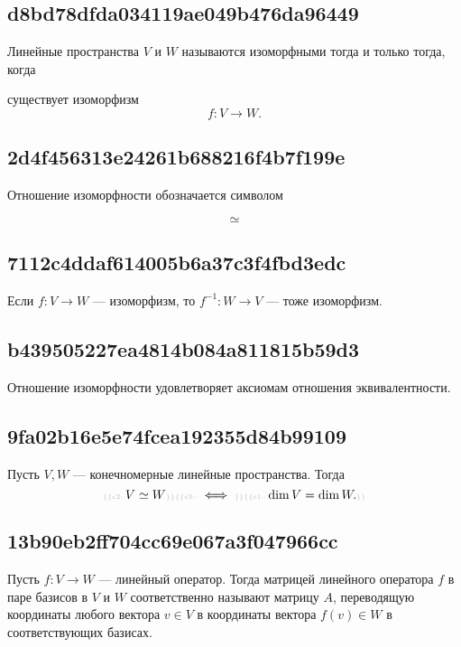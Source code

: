 \documentclass[11pt, a5paper]{article}
\newenvironment{note}[1]{\goodbreak\par\subsection{\hfill \color{lightgray}\tiny #1}}{}
\newenvironment{icloze}[2][\ldots]{%
  \ignorespaces\text{\tiny \color{lightgray} \{\{c#2::}\hspace{0pt}%
}{%
  \hspace{0pt}\text{\tiny \color{lightgray}\}\}}\unskip%
}
\begin{document}
\begin{note}{d8bd78dfda034119ae049b476da96449}
    Линейные пространства \( V \) и \( W \) называются \begin{icloze}{1}и\-зо\-мор\-фны\-ми\end{icloze} тогда и только тогда, когда \begin{icloze}{2}
        существует изоморфизм
        \[
            f : V \to W.
        \]
    \end{icloze}
\end{note}

\begin{note}{2d4f456313e24261b688216f4b7f199e}
    Отношение \begin{icloze}{2}изоморфности\end{icloze} обозначается символом \begin{icloze}{1}
        \[
            \simeq
        \]
    \end{icloze}
\end{note}

\begin{note}{7112c4ddaf614005b6a37c3f4fbd3edc}
    Если \( f : V \to W \) --- изоморфизм, то \( f^{-1} : W \to V \) \begin{icloze}{1}--- тоже изоморфизм.\end{icloze}
\end{note}

\begin{note}{b439505227ea4814b084a811815b59d3}
    Отношение изоморфности удовлетворяет аксиомам отношения \begin{icloze}{1}эквивалентности.\end{icloze}
\end{note}

\begin{note}{9fa02b16e5e74fcea192355d84b99109}
    Пусть \( V, W \) --- конечномерные линейные пространства. Тогда
    \[
        \begin{icloze}{2}V \simeq W\end{icloze} \begin{icloze}{3}\iff\end{icloze} \begin{icloze}{1}\dim V = \dim W.\end{icloze}
    \]
\end{note}

\begin{note}{13b90eb2ff704cc69e067a3f047966cc}
    Пусть \( f : V \to W \) --- линейный оператор. Тогда \begin{icloze}{2}матрицей линейного оператора \( f \) в паре базисов в \( V \) и \( W \) со\-от\-вет\-ствен\-но\end{icloze} называют \begin{icloze}{1}матрицу \( A \), переводящую координаты любого вектора \( v \in V \) в координаты вектора \( f(v) \in W \) в соответствующих базисах.\end{icloze}
\end{note}
\end{document}
